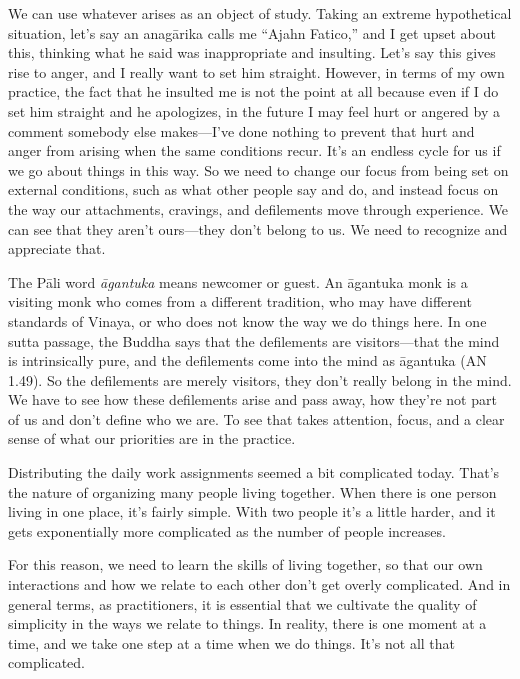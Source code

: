 We can use whatever arises as an object of study. Taking an extreme 
hypothetical situation, let's say an anagārika calls me ``Ajahn 
Fatico,'' and I get upset about this, thinking what he said was 
inappropriate and insulting. Let's say this gives rise to anger, and I 
really want to set him straight. However, in terms of my own practice, 
the fact that he insulted me is not the point at all because even if I 
do set him straight and he apologizes, in the future I may feel hurt or 
angered by a comment somebody else makes---I've done nothing to prevent 
that hurt and anger from arising when the same conditions recur. It's 
an endless cycle for us if we go about things in this way. So we need 
to change our focus from being set on external conditions, such as what 
other people say and do, and instead focus on the way our attachments, 
cravings, and defilements move through experience. We can see that they 
aren't ours---they don't belong to us. We need to recognize and 
appreciate that.

The Pāli word \emph{āgantuka} means newcomer or guest. An āgantuka 
monk is a visiting monk who comes from a different tradition, who may 
have different standards of Vinaya, or who does not know the way we do 
things here. In one sutta passage, the Buddha says that the defilements 
are visitors---that the mind is intrinsically pure, and the defilements 
come into the mind as āgantuka (AN 1.49). So the defilements are 
merely visitors, they don't really belong in the mind. We have to see 
how these defilements arise and pass away, how they're not part of us 
and don't define who we are. To see that takes attention, focus, and a 
clear sense of what our priorities are in the practice.


Distributing the daily work assignments seemed a bit complicated today. 
That's the nature of organizing many people living together. When there 
is one person living in one place, it's fairly simple. With two people 
it's a little harder, and it gets exponentially more complicated as the 
number of people increases.

For this reason, we need to learn the skills of living together, so 
that our own interactions and how we relate to each other don't get 
overly complicated. And in general terms, as practitioners, it is 
essential that we cultivate the quality of simplicity in the ways we 
relate to things. In reality, there is one moment at a time, and we 
take one step at a time when we do things. It's not all that 
complicated.

